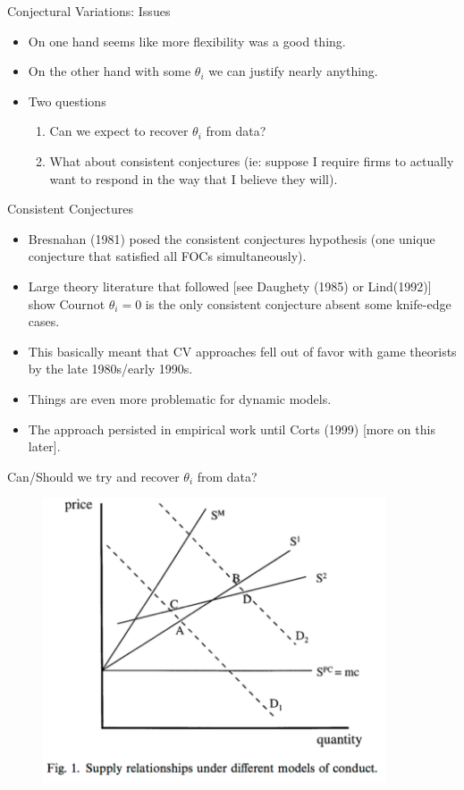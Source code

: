 \documentclass[xcolor=pdftex,dvipsnames,table,mathserif]{beamer}
\begin{document}
\begin{frame}{Conjectural Variations: Issues}
\begin{itemize}
\item On one hand seems like more flexibility was a good thing.
\item On the other hand with some $\theta_i$ we can justify nearly anything.
\item Two questions
\begin{enumerate}
\item Can we expect to recover $\theta_i$ from data?
\item What about \alert{consistent conjectures} (ie: suppose I require firms to actually want to respond in the way that I believe they will).
\end{enumerate}
\end{itemize}
\end{frame}



\begin{frame}{Consistent Conjectures}
\begin{itemize}
\item Bresnahan (1981) posed the consistent conjectures hypothesis (one unique conjecture that satisfied all FOCs simultaneously).
\item Large theory literature that followed [see Daughety (1985) or Lind(1992)] show Cournot $\theta_i=0$ is the only consistent conjecture absent some knife-edge cases.
\item This basically meant that CV approaches fell out of favor with game theorists by the late 1980s/early 1990s.
\item Things are even more problematic for dynamic models.
\item The approach persisted in empirical work until Corts (1999) [more on this later].
\end{itemize}
\end{frame}

\begin{frame}{Can/Should we try and recover $\theta_i$ from data?}
\begin{figure}
\begin{center}
\includegraphics[width=4in]{resources/cortsfigure.png}
\end{center}
\end{figure}
\end{frame}
\end{document}
